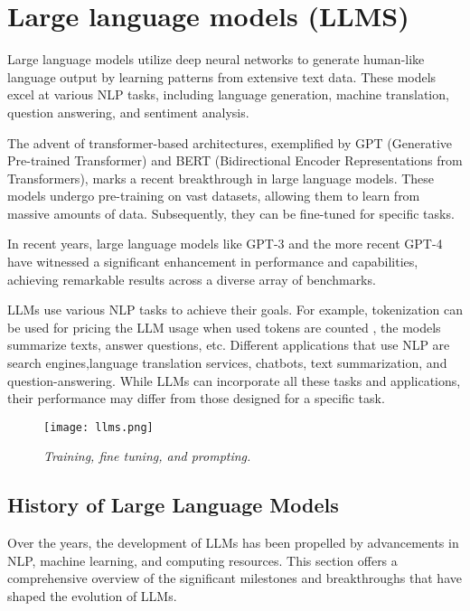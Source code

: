 \section{Large language models (LLMS)}

Large language models utilize deep neural networks to generate human-like language output by learning patterns from extensive text data. These models excel at various NLP tasks, including language generation, machine translation, question answering, and sentiment analysis.

The advent of transformer-based architectures, exemplified by GPT (Generative Pre-trained Transformer) and BERT (Bidirectional Encoder Representations from Transformers), marks a recent breakthrough in large language models. These models undergo pre-training on vast datasets, allowing them to learn from massive amounts of data. Subsequently, they can be fine-tuned for specific tasks.

In recent years, large language models like GPT-3 and the more recent GPT-4 have witnessed a significant enhancement in performance and capabilities, achieving remarkable results across a diverse array of benchmarks.

LLMs use various NLP tasks to achieve their goals. For example, tokenization can be
used for pricing the LLM usage when used tokens are counted \cite{openai:tokens}, the models summarize texts, answer questions, etc. Different applications that use NLP are search engines,language translation services, chatbots, text summarization, and question-answering.
While LLMs can incorporate all these tasks and applications, their performance may differ
from those designed for a specific task.

\begin{figure}[H]
    \centering
    \texttt{[image: llms.png]}
    \caption{
        \it{Training, fine tuning, and prompting.}
    }
\end{figure}

\subsection{History of Large Language Models}

Over the years, the development of LLMs has been propelled by advancements in NLP, machine learning, and computing resources. This section offers a comprehensive overview of the significant milestones and breakthroughs that have shaped the evolution of LLMs.

